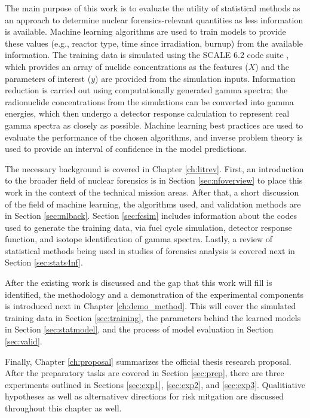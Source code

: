 The main purpose of this work is to evaluate the utility of statistical methods
as an approach to determine nuclear forensics-relevant quantities as less
information is available. Machine learning algorithms are used to train models
to provide these values (e.g., reactor type, time since irradiation, burnup)
from the available information. The training data is simulated using the SCALE
6.2 code suite \cite{scale}, which provides an array of nuclide concentrations
as the features ($X$) and the parameters of interest ($y$) are provided from
the simulation inputs.  Information reduction is carried out using
computationally generated gamma spectra; the radionuclide concentrations from
the simulations can be converted into gamma energies, which then undergo a
detector response calculation to represent real gamma spectra as closely as
possible. Machine learning best practices are used to evaluate the performance
of the chosen algorithms, and inverse problem theory is used to provide an
interval of confidence in the model predictions.

The necessary background is covered in Chapter \ref{ch:litrev}.  First, an
introduction to the broader field of nuclear forensics is in Section
\ref{sec:nfoverview} to place this work in the context of the technical mission
areas. After that, a short discussion of the field of machine learning, the
algorithms used, and validation methods are in Section \ref{sec:mlback}.
Section \ref{sec:fcsim} includes information about the codes used to generate
the training data, via fuel cycle simulation, detector response function, and
isotope identification of gamma spectra.  Lastly, a review of statistical
methods being used in studies of forensics analysis is covered next in Section
\ref{sec:stats4nf}. 

After the existing work is discussed and the gap that this work will fill is
identified, the methodology and a demonstration of the experimental components
is introduced next in Chapter \ref{ch:demo_method}. This will cover the
simulated training data in Section \ref{sec:training}, the parameters behind
the learned models in Section \ref{sec:statmodel}, and the process of model
evaluation in Section \ref{sec:valid}.  

Finally, Chapter \ref{ch:proposal} summarizes the official thesis research
proposal. After the preparatory tasks are covered in Section \ref{sec:prep},
there are three experiments outlined in Sections \ref{sec:exp1},
\ref{sec:exp2}, and \ref{sec:exp3}. Qualitiative hypotheses as well as
alternativev directions for risk mitgation are discussed throughout this
chapter as well. 
